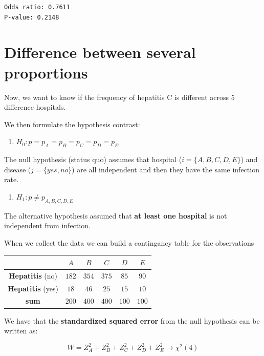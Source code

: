 \documentclass[
]{book}
\providecommand{\tightlist}{%
  \setlength{\itemsep}{0pt}\setlength{\parskip}{0pt}}
\begin{document}
\begin{verbatim}
Odds ratio: 0.7611
P-value: 0.2148
\end{verbatim}

\hypertarget{difference-between-several-proportions}{%
\section{Difference between several proportions}\label{difference-between-several-proportions}}

Now, we want to know if the frequency of hepatitis C is different across \(5\) difference hospitals.

We then formulate the hypothesis contrast:

\begin{enumerate}
\def\labelenumi{\alph{enumi}.}
\tightlist
\item
  \(H_0: p=p_A=p_B=p_C=p_D=p_E\)
\end{enumerate}

The null hypothesis (status quo) assumes that hospital (\(i=\{A,B,C,D,E\}\)) and disease (\(j=\{yes, no\}\)) are all independent and then they have the same infection rate.

\begin{enumerate}
\def\labelenumi{\alph{enumi}.}
\setcounter{enumi}{1}
\tightlist
\item
  \(H_1: p\neq p_{A,B,C,D,E}\)
\end{enumerate}

The alternative hypothesis assumed that \textbf{at least one hospital} is not independent from infection.

When we collect the data we can build a contingancy table for the observations

\begin{longtable}[]{@{}cccccc@{}}
\toprule
& \(A\) & \(B\) & \(C\) & \(D\) & \(E\) \\
\midrule
\endhead
\textbf{Hepatitis} (no) & \(182\) & \(354\) & \(375\) & \(85\) & \(90\) \\
\textbf{Hepatitis} (yes) & \(18\) & \(46\) & \(25\) & \(15\) & \(10\) \\
\textbf{sum} & \(200\) & \(400\) & \(400\) & \(100\) & \(100\) \\
\bottomrule
\end{longtable}

We have that the \textbf{standardized squared error} from the null hypothesis can be written as:

\[W= Z_A^2+Z_B^2+Z_C^2+Z_D^2+Z_E^2\rightarrow \chi^2(4)\]
\end{document}
